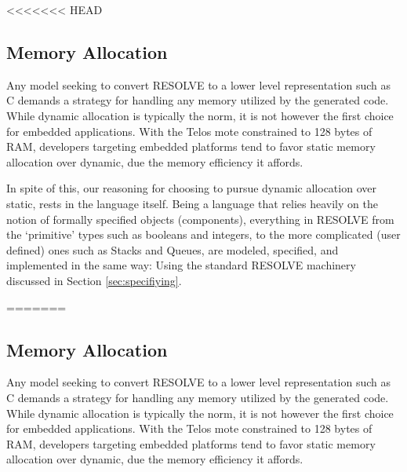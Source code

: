 
<<<<<<< HEAD
\subsection{Memory Allocation}

Any model seeking to convert RESOLVE to a lower level representation such as C demands a strategy for handling any memory utilized by the generated code. While dynamic allocation is typically the norm, it is not however the first choice for embedded applications. With the Telos mote constrained to 128 bytes of RAM, developers targeting embedded platforms tend to favor static memory allocation over dynamic, due the memory efficiency it affords. 


In spite of this, our reasoning for choosing to pursue dynamic allocation over static, rests in the language itself. Being a language that relies heavily on the notion of formally specified objects (components), everything in RESOLVE from the `primitive' types such as booleans and integers, to the more complicated (user defined) ones such as Stacks and Queues, are modeled, specified, and implemented in the same way: Using the standard RESOLVE machinery discussed in Section \ref{sec:specifiying}. 

=======
\subsection{Memory Allocation}\label{sec:mem}

Any model seeking to convert RESOLVE to a lower level representation such as C demands a strategy for handling any memory utilized by the generated code. While dynamic allocation is typically the norm, it is not however the first choice for embedded applications. With the Telos mote constrained to 128 bytes of RAM, developers targeting embedded platforms tend to favor static memory allocation over dynamic, due the memory efficiency it affords. 

